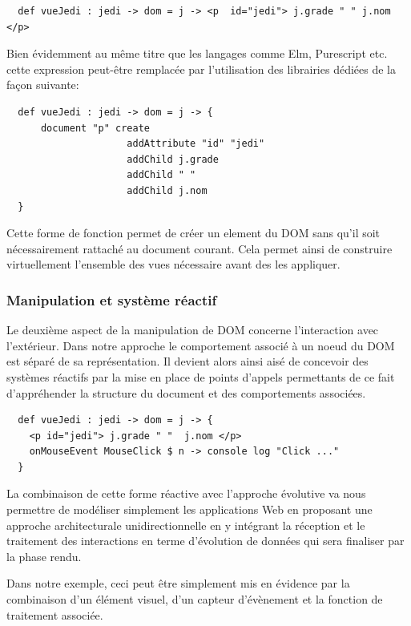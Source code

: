 \documentclass[twoside,a4paper]{article}
\begin{document}
\lstset{language=Thicket}
\begin{lstlisting}
  def vueJedi : jedi -> dom = j -> <p  id="jedi"> j.grade " " j.nom </p> 
\end{lstlisting}

Bien évidemment au  même titre que les langages  comme Elm, Purescript
etc.   cette  expression  peut-être remplacée  par  l'utilisation  des
librairies dédiées de la façon suivante:

\begin{lstlisting}
  def vueJedi : jedi -> dom = j -> {
      document "p" create 
                     addAttribute "id" "jedi" 
                     addChild j.grade 
                     addChild " " 
                     addChild j.nom
  }
\end{lstlisting}

Cette forme de  fonction permet de créer un element  du DOM sans qu'il
soit nécessairement  rattaché au document courant.   Cela permet ainsi
de construire  virtuellement l'ensemble  des vues nécessaire  avant des
les appliquer.

\subsubsection{Manipulation et système réactif}

Le deuxième  aspect de la  manipulation de DOM  concerne l'interaction
avec l'extérieur.   Dans notre approche  le comportement associé  à un
noeud du DOM est séparé de  sa représentation.  Il devient alors ainsi
aisé de concevoir des systèmes réactifs par la mise en place de points
d'appels permettants de ce fait  d'appréhender la structure du document
et des comportements associées.

\begin{lstlisting}
  def vueJedi : jedi -> dom = j -> {
    <p id="jedi"> j.grade " "  j.nom </p> 
    onMouseEvent MouseClick $ n -> console log "Click ..."
  }
\end{lstlisting}

La combinaison  de cette forme  réactive avec l'approche  évolutive va
nous  permettre  de  modéliser  simplement  les  applications  Web  en
proposant     une     approche    architecturale     unidirectionnelle
\cite{unidirectionnal} en  y intégrant  la réception et  le traitement
des interactions  en terme d'évolution  de données qui  sera finaliser
par la phase rendu.
 
Dans notre exemple,  ceci peut être simplement mis en  évidence par la
combinaison  d'un  élément  visuel,  d'un capteur  d'évènement  et  la 
fonction de traitement associée.
\end{document}
